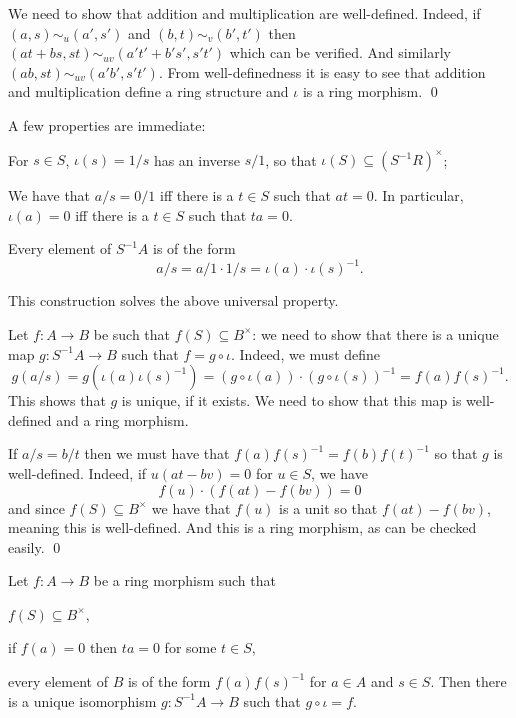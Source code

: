 \eprop

\bproof

    We need to show that addition and multiplication are well-defined.
    Indeed, if $(a,s)\sim_u(a',s')$ and $(b,t)\sim_v(b',t')$ then $(at+bs,st)\sim_{uv}(a't'+b's',s't')$ which can be verified.
    And similarly $(ab,st)\sim_{uv}(a'b',s't')$.
    From well-definedness it is easy to see that addition and multiplication define a ring structure and $\iota$ is a ring morphism.
    \qed

\eproof

A few properties are immediate:
\benum
    \item For $s\in S$, $\iota(s)=1/s$ has an inverse $s/1$, so that $\iota(S)\subseteq(S^{-1}R)^\times$;
    \item We have that $a/s=0/1$ iff there is a $t\in S$ such that $at=0$.
    In particular, $\iota(a)=0$ iff there is a $t\in S$ such that $ta=0$.
    \item Every element of $S^{-1}A$ is of the form
    $$ a/s = a/1\cdot1/s = \iota(a)\cdot\iota(s)^{-1} . $$
\eenum

\bthrm

    This construction solves the above universal property.

\ethrm

\bproof

    Let $f\colon A\to B$ be such that $f(S)\subseteq B^\times$: we need to show that there is a unique map $g\colon S^{-1}A\to B$
    such that $f=g\circ\iota$.
    Indeed, we must define
    $$ g(a/s) = g(\iota(a)\iota(s)^{-1}) = (g\circ\iota(a))\cdot(g\circ\iota(s))^{-1} = f(a)f(s)^{-1} . $$
    This shows that $g$ is unique, if it exists.
    We need to show that this map is well-defined and a ring morphism.

    If $a/s=b/t$ then we must have that $f(a)f(s)^{-1}=f(b)f(t)^{-1}$ so that $g$ is well-defined.
    Indeed, if $u(at-bv)=0$ for $u\in S$, we have
    $$ f(u)\cdot(f(at)-f(bv)) = 0 $$
    and since $f(S)\subseteq B^\times$ we have that $f(u)$ is a unit so that $f(at)-f(bv)$, meaning this is well-defined.
    And this is a ring morphism, as can be checked easily.
    \qed

\eproof

\bcoro

    Let $f\colon A\to B$ be a ring morphism such that
    \benum
        \item $f(S)\subseteq B^\times$,
        \item if $f(a)=0$ then $ta=0$ for some $t\in S$,
        \item every element of $B$ is of the form $f(a)f(s)^{-1}$ for $a\in A$ and $s\in S$.
    \eenum
    Then there is a unique isomorphism $g\colon S^{-1}A\to B$ such that $g\circ\iota=f$.

